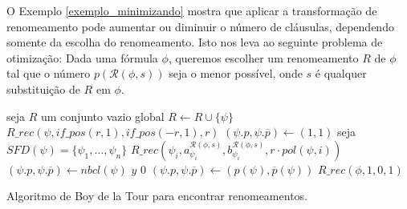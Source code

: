 
O Exemplo \ref{exemplo_minimizando} mostra que aplicar a transformação de renomeamento pode aumentar ou diminuir o número de cláusulas, dependendo somente da escolha do renomeamento. Isto nos leva ao seguinte problema de otimização: Dada uma fórmula $\phi$, queremos escolher um renomeamento $R$ de $\phi$ tal que o número $p(\mathcal{R}(\phi,s))$ seja o menor possível, onde $s$ é qualquer substituição de $R$ em $\phi$.

\begin{algorithm}
	\begin{algorithmic}[1]
		\State seja $R$ um conjunto vazio global
					\State $R \gets R \cup \{\psi \}$
					\State $R\_rec(\psi,if\_pos(r,1),if\_pos(-r,1),r)$
					\State $(\psi.p,\psi.\overline{p}) \gets (1,1)$
				\Else
					\State seja $SFD(\psi) = \{\psi_1,...,\psi_n \}$
						\State $R\_rec(\psi_i,a_{\psi_i}^{\mathcal{R}(\phi,s)},b_{\psi_i}^{\mathcal{R}(\phi,s)},r \cdot pol(\psi,i))$
					\EndFor
					\State $(\psi.p,\psi.\overline{p}) \gets nbcl(\psi)$
				\EndIf
			\EndIf
		\EndFunction
				\Return $y$
			\EndIf
			\Return $0$
		\EndFunction
			\State $(\psi.p,\psi.\overline{p}) \gets (p(\psi),\overline{p}(\psi))$
		\EndFor
		\State $R\_rec(\phi,1,0,1)$
	\end{algorithmic}
	\caption{Algoritmo de Boy de la Tour para encontrar renomeamentos.}
	\label{boydelatour}
\end{algorithm}

